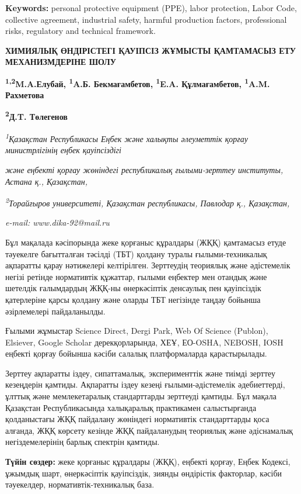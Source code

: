 {{\bfseries Keywords:} personal protective equipment (PPE), labor
protection, Labor Code, collective agreement, industrial safety, harmful
production factors, professional risks, regulatory and technical
framework.

{\bfseries ХИМИЯЛЫҚ ӨНДІРІСТЕГІ ҚАУІПСІЗ ЖҰМЫСТЫ ҚАМТАМАСЫЗ ЕТУ
МЕХАНИЗМДЕРІНЕ ШОЛУ}

{\bfseries \textsuperscript{1,2}M.A.Елубай, \textsuperscript{1}A.Б.
Бекмағамбетов, \textsuperscript{1}E.A. Құлмағамбетов,
\textsuperscript{1}A.M. Рахметова}

{\bfseries \textsuperscript{2}Д.T. Төлегенов\textsuperscript{\envelope }}

\emph{\textsuperscript{1}Қазақстан Республикасы Еңбек және халықты
әлеуметтік қорғау министрлігінің еңбек қауіпсіздігі}

\emph{және еңбекті қорғау жөніндегі республикалық ғылыми-зерттеу
институты, Астана қ., Қазақстан,}

\emph{\textsuperscript{2}Торайғыров университеті, Қазақстан
республикасы, Павлодар қ., Қазақстан,}

\emph{e-mail: www.dika-92@mail.ru}

Бұл мақалада кәсіпорында жеке қорғаныс құралдары (ЖҚҚ) қамтамасыз етуде
тәуекелге бағытталған тәсілді (ТБТ) қолдану туралы ғылыми-техникалық
ақпаратты қарау нәтижелері келтірілген. Зерттеудің теориялық және
әдістемелік негізі ретінде нормативтік құжаттар, ғылыми еңбектер мен
отандық және шетелдік ғалымдардың ЖҚҚ-ны өнеркәсіптік денсаулық пен
қауіпсіздік қатерлеріне қарсы қолдану және оларды ТБТ негізінде таңдау
бойынша әзірлемелері пайдаланылды.

Ғылыми жұмыстар Science Direct, Dergi Park, Web Of Science (Publon),
Elsiever, Google Scholar дерекқорларында, ХЕҰ, ЕО-OSHA, NEBOSH, IOSH
еңбекті қорғау бойынша кәсіби салалық платформаларда қарастырылады.

Зерттеу ақпаратты іздеу, сипаттамалық, эксперименттік және тиімді
зерттеу кезеңдерін қамтиды. Ақпаратты іздеу кезеңі ғылыми-әдістемелік
әдебиеттерді, ұлттық және мемлекетаралық стандарттарды зерттеуді
қамтиды. Бұл мақала Қазақстан Республикасында халықаралық практикамен
салыстырғанда қолданыстағы ЖҚҚ пайдалану жөніндегі нормативтік
стандарттарды қоса алғанда, ЖҚҚ көрсету кезінде ЖҚҚ пайдаланудың
теориялық және әдіснамалық негіздемелерінің барлық спектрін қамтиды.

{\bfseries Түйін сөздер:} жеке қорғаныс құралдары (ЖҚҚ), еңбекті қорғау,
Еңбек Кодексі, ұжымдық шарт, өнеркәсіптік қауіпсіздік, зиянды өндірістік
факторлар, кәсіби тәуекелдер, нормативтік-техникалық база.

}
